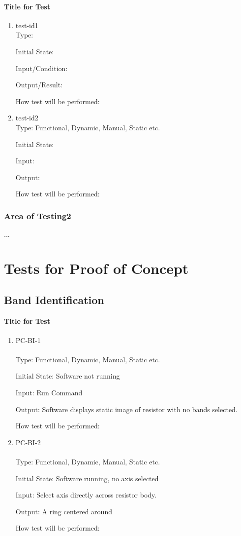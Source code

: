 \documentclass[12pt, titlepage]{article}
\begin{document}
\paragraph{Title for Test}
\begin{enumerate}
\item{test-id1\\}
Type: 
					
Initial State: 
					
Input/Condition: 
					
Output/Result: 
					
How test will be performed: 
					
\item{test-id2\\}
Type: Functional, Dynamic, Manual, Static etc.
					
Initial State: 
					
Input: 
					
Output: 
					
How test will be performed: 
\end{enumerate}
\subsubsection{Area of Testing2}
...
\section{Tests for Proof of Concept}
\subsection{Band Identification}
		
\paragraph{Title for Test}
\begin{enumerate}
\item{PC-BI-1\\}
\\
Type: Functional, Dynamic, Manual, Static etc.
					
Initial State: Software not running
					
Input: Run Command
					
Output: Software displays static image of resistor with no bands selected.
					
How test will be performed: 
					
\item{PC-BI-2\\}
\\
Type: Functional, Dynamic, Manual, Static etc.
					
Initial State: Software running, no axis selected
					
Input: Select axis directly across resistor body.
					
Output:  A ring centered around
					
How test will be performed: 
\end{enumerate}
\end{document}
